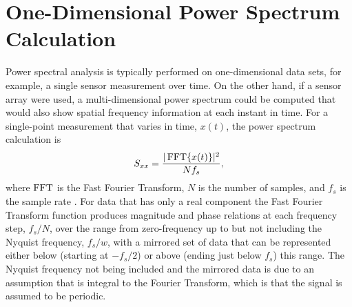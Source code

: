 \section{One-Dimensional Power Spectrum Calculation}
Power spectral analysis is typically performed on one-dimensional data sets, for example, a single sensor measurement over time.
On the other hand, if a sensor array were used, a multi-dimensional power spectrum could be computed that would also show spatial frequency information at each instant in time.
For a single-point measurement that varies in time, $x(t)$, the power spectrum calculation is
\begin{equation}
 S_{xx} = \frac{|\operatorname{FFT}\{x(t)\}|^2}{Nf_{s}} \textrm{,}
 \label{eqn:04_basic_sxx}
\end{equation}
where $\operatorname{FFT}$ is the Fast Fourier Transform, $N$ is the number of samples, and $f_{s}$ is the sample rate \cite{Blackman-1958-4QtKgDb8}.
For data that has only a real component the Fast Fourier Transform function produces magnitude and phase relations at each frequency step, $f_{s}/N$, over the range from zero-frequency up to but not including the Nyquist frequency, $f_s/w$, with a mirrored set of data that can be represented either below (starting at $-f_s/2$) or above (ending just below $f_s$) this range.
The Nyquist frequency not being included and the mirrored data is due to an assumption that is integral to the Fourier Transform, which is that the signal is assumed to be periodic.

